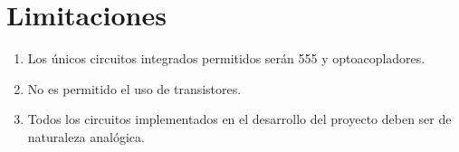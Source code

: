 \documentclass[letterpaper, 12 pt, conference]{ieeeconf}  %
\begin{document}
\section{Limitaciones}
\begin{enumerate}
    \item Los únicos circuitos integrados permitidos serán 555 y optoacopladores.
    \item No es permitido el uso de transistores.
    \item Todos los circuitos implementados en el desarrollo del proyecto deben ser de naturaleza analógica.
\end{enumerate}

\addtolength{\textheight}{-12cm}   %
\end{document}
